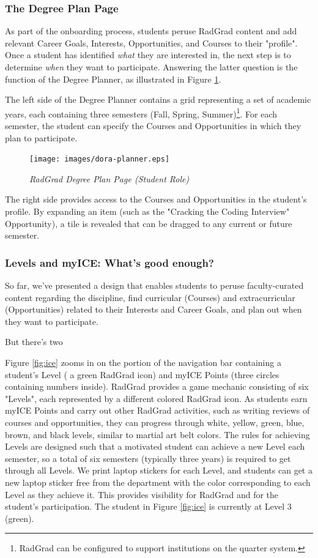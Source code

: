 \documentclass[acmsmall]{acmart}
\begin{document}
\subsubsection{The Degree Plan Page}

As part of the onboarding process, students peruse RadGrad content and add relevant Career Goals, Interests, Opportunities, and Courses to their "profile".  Once a student has identified {\em what} they are interested in, the next step is to determine {\em when} they want to participate. Answering the latter question is the function of the Degree Planner, as illustrated in  Figure \ref{fig:radgrad-student-degree-plan}.

The left side of the Degree Planner contains a grid representing a set of academic years, each containing three semesters (Fall, Spring, Summer)\footnote{RadGrad can be configured to support institutions on the quarter system.}.  For each semester, the student can specify the Courses and Opportunities in which they plan to participate.

\begin{figure}[ht]
\centering
\texttt{[image: images/dora-planner.eps]}
\caption{\em RadGrad Degree Plan Page (Student Role)}
\label{fig:radgrad-student-degree-plan}
\end{figure}

The right side provides access to the Courses and Opportunities in the student's profile. By expanding an item (such as the "Cracking the Coding Interview" Opportunity), a tile is revealed that can be dragged to any current or future semester.

\subsubsection{Levels and myICE: What's good enough?}

So far, we've presented a design that enables students to peruse faculty-curated content regarding the discipline, find curricular (Courses) and extracurricular (Opportunities) related to their Interests and Career Goals, and plan out when they want to participate.

But there's two

Figure \ref{fig:ice} zooms in on the portion of the navigation bar containing a student's Level ( a green RadGrad icon) and myICE Points (three circles containing numbers inside). RadGrad provides a game mechanic consisting of six "Levels", each represented by a different colored RadGrad icon. As students earn myICE Points and carry out other RadGrad activities, such as writing reviews of courses and opportunities, they can progress through white, yellow, green, blue, brown, and black levels, similar to martial art belt colors. The rules for achieving Levels are designed such that a motivated student can achieve a new Level each semester, so a total of six semesters (typically three years) is required to get through all Levels. We print laptop stickers for each Level, and students can get a new laptop sticker free from the department with the color corresponding to each Level as they achieve it. This provides visibility for RadGrad and for the student's participation.  The student in Figure \ref{fig:ice} is currently at Level 3 (green).
\end{document}
